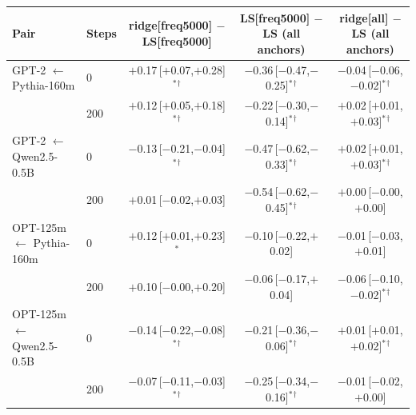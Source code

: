 \begin{tabular}{llccc}
\toprule
Pair & Steps & ridge[freq5000] $-$ LS[freq5000] & LS[freq5000] $-$ LS (all anchors) & ridge[all] $-$ LS (all anchors) \\
\midrule
GPT-2 $\leftarrow$ Pythia-160m & 0 & $+$0.17\,[$+$0.07,$+$0.28]$^{*}$$^{\dagger}$ & $-$0.36\,[$-$0.47,$-$0.25]$^{*}$$^{\dagger}$ & $-$0.04\,[$-$0.06,$-$0.02]$^{*}$$^{\dagger}$ \\
 & 200 & $+$0.12\,[$+$0.05,$+$0.18]$^{*}$$^{\dagger}$ & $-$0.22\,[$-$0.30,$-$0.14]$^{*}$$^{\dagger}$ & $+$0.02\,[$+$0.01,$+$0.03]$^{*}$$^{\dagger}$ \\
\addlinespace
GPT-2 $\leftarrow$ Qwen2.5-0.5B & 0 & $-$0.13\,[$-$0.21,$-$0.04]$^{*}$$^{\dagger}$ & $-$0.47\,[$-$0.62,$-$0.33]$^{*}$$^{\dagger}$ & $+$0.02\,[$+$0.01,$+$0.03]$^{*}$$^{\dagger}$ \\
 & 200 & $+$0.01\,[$-$0.02,$+$0.03] & $-$0.54\,[$-$0.62,$-$0.45]$^{*}$$^{\dagger}$ & $+$0.00\,[$-$0.00,$+$0.00] \\
\addlinespace
OPT-125m $\leftarrow$ Pythia-160m & 0 & $+$0.12\,[$+$0.01,$+$0.23]$^{*}$ & $-$0.10\,[$-$0.22,$+$0.02] & $-$0.01\,[$-$0.03,$+$0.01] \\
 & 200 & $+$0.10\,[$-$0.00,$+$0.20] & $-$0.06\,[$-$0.17,$+$0.04] & $-$0.06\,[$-$0.10,$-$0.02]$^{*}$$^{\dagger}$ \\
\addlinespace
OPT-125m $\leftarrow$ Qwen2.5-0.5B & 0 & $-$0.14\,[$-$0.22,$-$0.08]$^{*}$$^{\dagger}$ & $-$0.21\,[$-$0.36,$-$0.06]$^{*}$$^{\dagger}$ & $+$0.01\,[$+$0.01,$+$0.02]$^{*}$$^{\dagger}$ \\
 & 200 & $-$0.07\,[$-$0.11,$-$0.03]$^{*}$$^{\dagger}$ & $-$0.25\,[$-$0.34,$-$0.16]$^{*}$$^{\dagger}$ & $-$0.01\,[$-$0.02,$+$0.00] \\
\bottomrule
\end{tabular}
